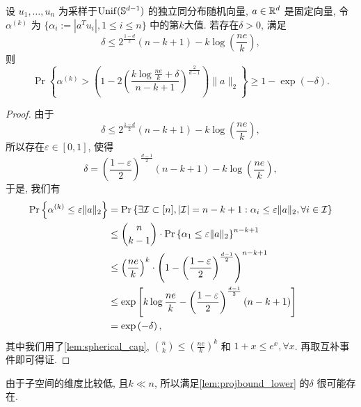 \begin{lemma} \label{lem:projbound_lower}
  设 \(u_1, \ldots, u_n \) 为采样于\(\operatorname{Unif}(\mathbb{S}^{d-1})\) 的独立同分布随机向量,
  \(a \in \mathbb{R}^d \) 是固定向量,
  令 \(\alpha^{(k)}\) 为 \(\{\alpha_i:= |a^T u_i|, 1 \le i \le n\}\) 中的第\(k\)大值.
  若存在\(\delta > 0\), 满足
  \[\delta \le 2^{\frac{1-d}{2}}(n-k+1)-k\log\left( \frac{ne}{k} \right),\]
  则
  \[
    \Pr\left\{\alpha^{(k)}>\left( 1-2\left(\frac{k\log \frac{ne}{k}+\delta}{n-k+1}
    \right)^{\frac{2}{d-1}}\right) \|a\|_2\right\}\ge 1-\exp(-\delta).
  \]
\end{lemma}
\begin{proof}
  由于
  \[\delta \le 2^{\frac{1-d}{2}}(n-k+1)-k\log\left( \frac{ne}{k} \right),\]
  所以存在\(\varepsilon\in [0, 1]\), 使得
  \[\delta=\left(\frac{1-\varepsilon}{2}\right)^{\frac{d-1}{2}}(n-k+1)-k\log\left( \frac{ne}{k} \right),\]
  于是, 我们有
  \begin{align*}
    \Pr\left\{\alpha^{(k)} \le \varepsilon \|a\|_2\right\} &= \Pr\left\{\exists \mathcal{I} \subset [n], |\mathcal{I}|=n-k+1:
  \alpha_i \le \varepsilon \|a\|_2, \forall i \in \mathcal{I}\right\} \\
    &\le \binom{n}{k-1} \cdot \Pr \left\{ \alpha_1 \le \varepsilon
    \|a\|_2\right\}^{n-k+1}\\
    &\le \left( \frac{ne}{k} \right)^k \cdot \left( 1-\left(
    \frac{1-\varepsilon}{2} \right)^{\frac{d-1}{2}} \right)^{n-k+1} \\
    &\le \exp \left[ k \log \frac{ne}{k}-\left(
    \frac{1-\varepsilon}{2}\right)^{\frac{d-1}{2}} (n-k+1) \right]\\
    &= \exp\left( -\delta \right),
  \end{align*}
  其中我们用了\autoref{lem:spherical_cap}, \(\binom{n}{k}\le
  (\frac{ne}{k})^k\) 和 \(1+x\le e^x, \forall x\).
  再取互补事件即可得证.
\end{proof}

\begin{remark}
  由于子空间的维度比较低, 且\(k\ll n\), 所以满足\autoref{lem:projbound_lower} 
  的\(\delta\) 很可能存在.
\end{remark}

